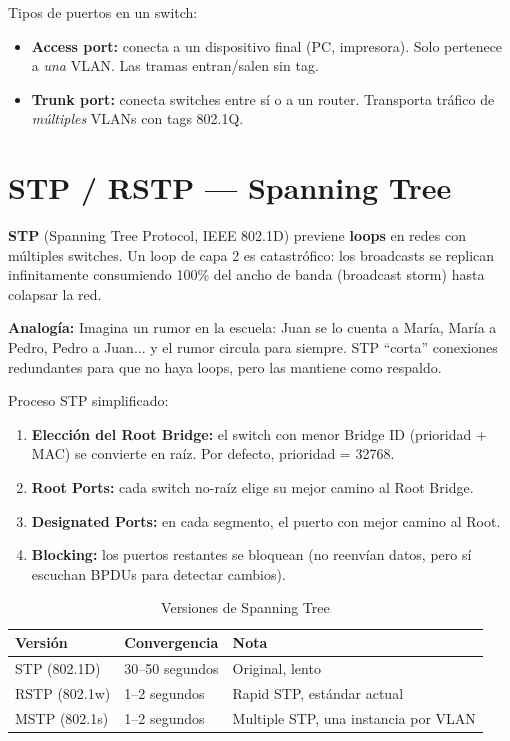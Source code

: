 Tipos de puertos en un switch:
\begin{itemize}
    \item \textbf{Access port:} conecta a un dispositivo final (PC, impresora).
          Solo pertenece a \textit{una} VLAN. Las tramas entran/salen sin tag.
    \item \textbf{Trunk port:} conecta switches entre sí o a un router.
          Transporta tráfico de \textit{múltiples} VLANs con tags 802.1Q.
\end{itemize}

\section{ STP / RSTP --- Spanning Tree}

\begin{concepto}
\textbf{STP} (Spanning Tree Protocol, IEEE 802.1D) previene \textbf{loops}
en redes con múltiples switches. Un loop de capa 2 es catastrófico:
los broadcasts se replican infinitamente consumiendo 100\% del ancho de banda
(broadcast storm) hasta colapsar la red.

 \textbf{Analogía:} Imagina un rumor en la escuela: Juan se
lo cuenta a María, María a Pedro, Pedro a Juan... y el rumor circula para
siempre. STP ``corta'' conexiones redundantes para que no haya loops,
pero las mantiene como respaldo.
\end{concepto}

Proceso STP simplificado:
\begin{enumerate}
    \item \textbf{Elección del Root Bridge:} el switch con menor Bridge ID
          (prioridad + MAC) se convierte en raíz. Por defecto, prioridad = 32768.
    \item \textbf{Root Ports:} cada switch no-raíz elige su mejor camino al Root Bridge.
    \item \textbf{Designated Ports:} en cada segmento, el puerto con mejor camino al Root.
    \item \textbf{Blocking:} los puertos restantes se bloquean (no reenvían datos,
          pero sí escuchan BPDUs para detectar cambios).
\end{enumerate}

\begin{table}[h!]
\centering
\renewcommand{\arraystretch}{1.3}
\begin{tabular}{lll}
\toprule
\textbf{Versión} & \textbf{Convergencia} & \textbf{Nota} \\
\midrule
STP (802.1D)  & 30--50 segundos & Original, lento \\
RSTP (802.1w) & 1--2 segundos  & Rapid STP, estándar actual \\
MSTP (802.1s) & 1--2 segundos  & Multiple STP, una instancia por VLAN \\
\bottomrule
\end{tabular}
\caption{Versiones de Spanning Tree}
\end{table}

